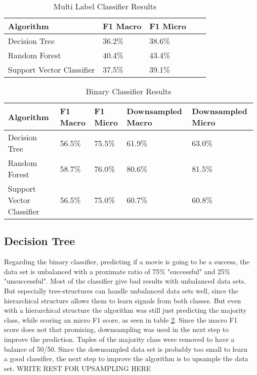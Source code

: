 \begin{center}
\begin{table}
	\begin{tabular}{ | p{3.5cm} | p{1.5cm} | p{1.5cm} | p{2cm} | p{2cm} |}
    \hline
    Algorithm & F1 Macro & F1 Micro \\ \hline
    Decision Tree & 36.2\% & 38.6\%  \\ \hline
    Random Forest & 40.4\% & 43.4\%  \\ \hline
    Support Vector Classifier & 37.5\% & 39.1\% \\
    \hline
    \end{tabular}
    \caption{Multi Label Classifier Results} 
    \label{tab:multi_classifier}
\end{table}
\end{center}

\begin{center}
\begin{table}
	\begin{tabular}{ | p{3.5cm} | p{1.5cm} | p{1.5cm} | p{2cm} | p{2cm} |}
    \hline
    Algorithm & F1 Macro & F1 Micro & Downsampled Macro  & Downsampled Micro\\ \hline
    Decision Tree & 56.5\% & 75.5\% & 61.9\% & 63.0\% \\ \hline
    Random Forest & 58.7\% & 76.0\% & 80.6\% & 81.5\% \\ \hline
    Support Vector Classifier & 56.5\% & 75.0\% & 60.7\% & 60.8\% \\
    \hline
    \end{tabular}
    \caption{Binary Classifier Results} 
    \label{tab:binary_classifier}
\end{table}
\end{center}

\subsection{Decision Tree}
Regarding the binary classifier, predicting if a movie is going to be a success, the data set is unbalanced with a proximate ratio of 75\% "successful" and 25\% "unsuccessful". Most of the classifier give bad results with unbalanced data sets. But especially tree-structures can handle unbalanced data sets well, since the hierarchical structure allows them to learn signals from both classes.
But even with a hierarchical structure the algorithm was still just predicting the majority class, while scoring an micro F1 score, as seen in table \ref{tab:binary_classifier}. Since the macro F1 score does not that promising, downsampling was used in the next step to improve the prediction.
Tuples of the majority class were removed to have a balance of 50/50.
Since the downsampled data set is probably too small to learn a good classifier, the next step to improve the algorithm is to upsample the data set. WRITE REST FOR UPSAMPLING HERE

